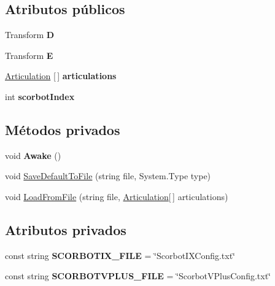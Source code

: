 \subsection*{Atributos públicos}
\begin{DoxyCompactItemize}
\item 
\mbox{\label{class_scorbot_model_a289b612c7d1813ad345f42432e7ba283}} 
Transform {\bfseries D}
\item 
\mbox{\label{class_scorbot_model_a2ba60afbee406ae079a8680b1836913b}} 
Transform {\bfseries E}
\item 
\mbox{\label{class_scorbot_model_a2c5605692707695fc2e4a260c5fbde03}} 
\mbox{\hyperlink{class_articulation}{Articulation}} \mbox{[}$\,$\mbox{]} {\bfseries articulations}
\item 
\mbox{\label{class_scorbot_model_af6bce49ef384fc8b753e7291ca682100}} 
int {\bfseries scorbot\+Index}
\end{DoxyCompactItemize}
\subsection*{Métodos privados}
\begin{DoxyCompactItemize}
\item 
\mbox{\label{class_scorbot_model_a8fe778901e324215e758a649ed963caa}} 
void {\bfseries Awake} ()
\item 
void \mbox{\hyperlink{class_scorbot_model_a3d2cb7f4874da87c692f35da06decb46}{Save\+Default\+To\+File}} (string file, System.\+Type type)
\item 
void \mbox{\hyperlink{class_scorbot_model_a35cbb52dd700f099d0f4d66b8516a69b}{Load\+From\+File}} (string file, \mbox{\hyperlink{class_articulation}{Articulation}}\mbox{[}$\,$\mbox{]} articulations)
\end{DoxyCompactItemize}
\subsection*{Atributos privados}
\begin{DoxyCompactItemize}
\item 
\mbox{\label{class_scorbot_model_a0922a140ce38f5d8b5299726ac2e7a0c}} 
const string {\bfseries S\+C\+O\+R\+B\+O\+T\+I\+X\+\_\+\+F\+I\+LE} = \char`\"{}Scorbot\+I\+X\+Config.\+txt\char`\"{}
\item 
\mbox{\label{class_scorbot_model_a92ba7ebeae4af682c58fe9753ca7ee6a}} 
const string {\bfseries S\+C\+O\+R\+B\+O\+T\+V\+P\+L\+U\+S\+\_\+\+F\+I\+LE} = \char`\"{}Scorbot\+V\+Plus\+Config.\+txt\char`\"{}
\end{DoxyCompactItemize}


